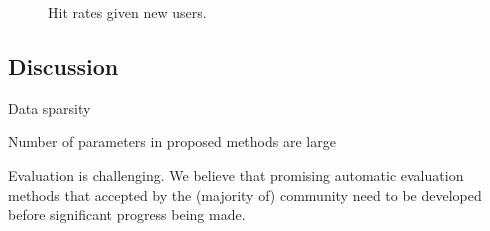 \begin{figure}[!h]
\centering
\caption{Hit rates given new users.}
\end{figure}


\subsection{Discussion}

Data sparsity

Number of parameters in proposed methods are large

Evaluation is challenging.
We believe that promising automatic evaluation methods that accepted by the (majority of) community need to be 
developed before significant progress being made.
